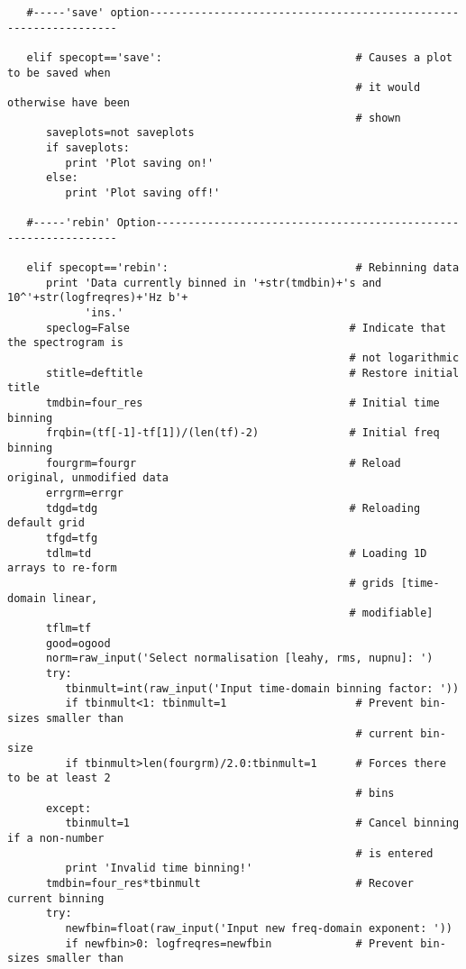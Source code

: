\begin{verbatim}
   #-----'save' option-----------------------------------------------------------------

   elif specopt=='save':                              # Causes a plot to be saved when
                                                      # it would otherwise have been
                                                      # shown
      saveplots=not saveplots
      if saveplots:
         print 'Plot saving on!'
      else:
         print 'Plot saving off!'

   #-----'rebin' Option----------------------------------------------------------------

   elif specopt=='rebin':                             # Rebinning data    
      print 'Data currently binned in '+str(tmdbin)+'s and 10^'+str(logfreqres)+'Hz b'+
            'ins.'
      speclog=False                                  # Indicate that the spectrogram is
                                                     # not logarithmic
      stitle=deftitle                                # Restore initial title
      tmdbin=four_res                                # Initial time binning
      frqbin=(tf[-1]-tf[1])/(len(tf)-2)              # Initial freq binning
      fourgrm=fourgr                                 # Reload original, unmodified data
      errgrm=errgr
      tdgd=tdg                                       # Reloading default grid
      tfgd=tfg
      tdlm=td                                        # Loading 1D arrays to re-form
                                                     # grids [time-domain linear,
                                                     # modifiable]
      tflm=tf
      good=ogood
      norm=raw_input('Select normalisation [leahy, rms, nupnu]: ')
      try:
         tbinmult=int(raw_input('Input time-domain binning factor: '))
         if tbinmult<1: tbinmult=1                    # Prevent bin-sizes smaller than
                                                      # current bin-size
         if tbinmult>len(fourgrm)/2.0:tbinmult=1      # Forces there to be at least 2
                                                      # bins
      except:
         tbinmult=1                                   # Cancel binning if a non-number
                                                      # is entered
         print 'Invalid time binning!'
      tmdbin=four_res*tbinmult                        # Recover current binning
      try:
         newfbin=float(raw_input('Input new freq-domain exponent: '))
         if newfbin>0: logfreqres=newfbin             # Prevent bin-sizes smaller than

\end{verbatim}
